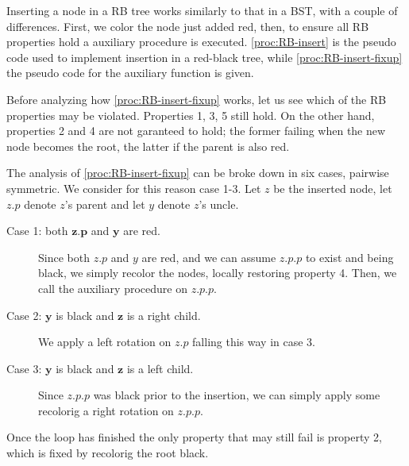 \documentclass{subfiles}
\begin{document}
\label{sec:RB-insert}
    Inserting a node in a RB tree works similarly to that in a BST, 
        with a couple of differences. First, we color the node just added red,
        then, to ensure all RB properties hold a auxiliary procedure is executed.
        \autoref{proc:RB-insert} is the pseudo code used to implement insertion in a red-black tree,
        while \autoref{proc:RB-insert-fixup} the pseudo code for the auxiliary function is given.

    Before analyzing how \autoref{proc:RB-insert-fixup} works, let us see which of the RB properties
        may be violated. Properties 1, 3, 5 still hold\footnotemark.
        On the other hand, properties 2 and 4 are not garanteed to hold; 
        the former failing when the new node becomes the root, the latter if the parent is also red.

    

    The analysis of \autoref{proc:RB-insert-fixup} can be broke down in six cases, 
        pairwise symmetric. We consider for this reason case 1-3.
        Let \(z\) be the inserted node, let \(z.p\) denote \(z\)'s parent and let \(y\) denote \(z\)'s uncle.
        \begin{description}
            \item [Case 1: both \(\mathbf{z.p}\) and \(\mathbf{y}\) are red.] 
                Since both \(z.p\) and \(y\) are red, 
                and we can assume \(z.p.p\) to exist and being black,
                we simply recolor the nodes, locally restoring property 4.
                Then, we call the auxiliary procedure on \(z.p.p\).

            \item [Case 2: \(\mathbf{y}\) is black and \(\mathbf{z}\) is a right child.]
                We apply a left rotation on \(z.p\) falling this way in case 3.

            \item [Case 3: \(\mathbf{y}\) is black and \(\mathbf{z}\) is a left child.] 
                Since \(z.p.p\) was black prior to the insertion,
                we can simply apply some recolorig a right rotation on \(z.p.p\).
        \end{description}
        Once the loop has finished the only property that may still fail is property 2,
        which is fixed by recolorig the root black.


    
    \clearpage
\end{document}

